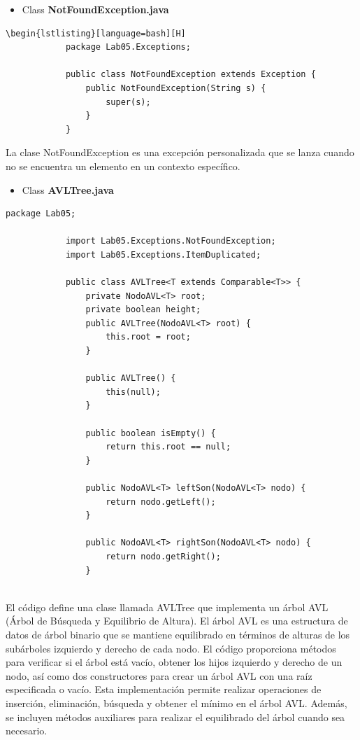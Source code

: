\documentclass{article}
\begin{document}
\begin{itemize}
        \item Class \textbf{NotFoundException.java}
    \end{itemize}
    \begin{lstlisting}[caption={\textbf{Excepción personalizada llamada "NotFoundException"}}]
        \begin{lstlisting}[language=bash][H] 
            package Lab05.Exceptions;
            
            public class NotFoundException extends Exception {
                public NotFoundException(String s) {
                    super(s);
                }
            }
         \end{lstlisting}
La clase NotFoundException es una excepción personalizada que se lanza cuando no se encuentra un elemento en un contexto específico.


\begin{itemize}
        \item Class \textbf{AVLTree.java}
    \end{itemize}
    \begin{lstlisting}[caption={\textbf{Árbol de Búsqueda y Equilibrio de Altura}}]
            package Lab05;
            
            import Lab05.Exceptions.NotFoundException;
            import Lab05.Exceptions.ItemDuplicated;
            
            public class AVLTree<T extends Comparable<T>> {
                private NodoAVL<T> root;
            	private boolean height;
                public AVLTree(NodoAVL<T> root) {
                    this.root = root;
                }
            
                public AVLTree() {
                    this(null);
                }
            
                public boolean isEmpty() {
                    return this.root == null;
                }
            
            	public NodoAVL<T> leftSon(NodoAVL<T> nodo) {
                    return nodo.getLeft();
            	}
            
            	public NodoAVL<T> rightSon(NodoAVL<T> nodo) {
                    return nodo.getRight();
            	}
            
         \end{lstlisting}
El código define una clase llamada AVLTree que implementa un árbol AVL (Árbol de Búsqueda y Equilibrio de Altura). El árbol AVL es una estructura de datos de árbol binario que se mantiene equilibrado en términos de alturas de los subárboles izquierdo y derecho de cada nodo. El código proporciona métodos para verificar si el árbol está vacío, obtener los hijos izquierdo y derecho de un nodo, así como dos constructores para crear un árbol AVL con una raíz especificada o vacío. Esta implementación permite realizar operaciones de inserción, eliminación, búsqueda y obtener el mínimo en el árbol AVL. Además, se incluyen métodos auxiliares para realizar el equilibrado del árbol cuando sea necesario.
\end{document}
